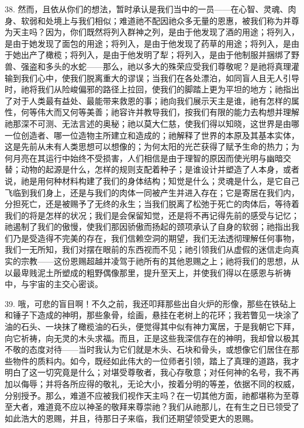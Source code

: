 38. 然而，且依从你们的想法，暂时承认是我们当中的一员——在心智、灵魂、肉身、软弱和处境上与我们相似；难道祂不配因祂众多无量的恩惠，被我们称为并尊为天主吗？因为，你们既然将列入群神之列，是由于他发现了酒的用途；将列入，是由于她发现了面包的用途；将列入，是由于他发现了药草的用途；将列入，是由于她出产了橄榄；将列入，是由于他发明了犁；将列入，是由于他制服并捆绑了野兽、强盗和多头的水蛇——那么，祂以多大的殊荣应受我们尊敬呢？是祂将真理灌输到我们心中，使我们脱离重大的谬误；当我们在各处漂泊，如同盲人且无人引导时，祂将我们从险峻偏邪的路径上拉回，使我们的脚踏上更为平坦的地方；祂指出了对于人类最有益处、最能带来救恩的事；祂向我们展示天主是谁，祂有怎样的属性，何等伟大而又何等美善；祂容许并教导我们，按我们有限的能力去构想并理解祂那深不可测、无法言述的奥秘；祂以莫大仁慈，使我们得以知晓，这世界是由哪一位创造者、哪一位造物主所建立和造成的；祂解释了世界的本原及其基本实体，这是先前从未有人类思想可以想像的；为何太阳的光芒获得了赋予生命的热力；为何月亮在其运行中始终不受损害，人们相信是由于理智的原因而使光明与幽暗交替；动物的起源是什么，怎样的规则支配着种子；是谁设计并塑造了人本身，或者说，祂是用何种材料构建了我们的身体结构；知觉是什么；灵魂是什么，是它自己飞临到我们身上，还是与我们的肉体一同被产生并进入存在；它是寄居在我们内，分担死亡，还是被赐予了无终的永生；当我们脱离了松弛于死亡的肉体后，等待着我们的将是怎样的状况；我们是会保留知觉，还是将不再记得先前的感受与记忆；祂遏制了我们的傲慢，使我们那因骄傲而扬起的颈项承认了自身的软弱；祂指出我们乃是受造得不完美的存在，我们信赖空洞的期望，我们无法透彻理解任何事物，我们一无所知，我们对摆在眼前的东西视而不见；祂引领我们从虚假的迷信走向真实的宗教——这份恩赐超越并凌驾于祂所有的其他恩赐之上；祂将我们的思想，从以最卑贱泥土所塑成的粗野偶像那里，提升至天上，并使我们得以在感恩与祈祷中，与宇宙的主交心密谈。\par

39. 哦，可悲的盲目啊！不久之前，我还叩拜那些出自火炉的形像，那些在铁砧上和锤子下造成的神明，那些象骨，绘画，悬挂在老树上的花环；我若瞥见一块涂了油的石头、一块抹了橄榄油的石头，便觉得其中似有神力寓居，于是我朝它下拜，向它祈祷，向无灵的木头求福。而且，正是这些我深信存在的神明，我却曾以极其不敬的态度对待——当时我认为它们就是木头、石块和骨头，或想像它们居住在那些物件的质料内。如今，既经如此伟大的一位师者引领，踏上了真理的道路，我才明白了这一切究竟是什么；对堪受尊敬者，我心存敬意；对任何神的名号，我不再加以侮辱；并将各所应得的敬礼，无论大小，按着分明的等差，依据不同的权威，分别授予。那么，难道不应被我们视作天主吗？在一切其他方面，祂都堪称为至尊至大者，难道竟不应以神圣的敬拜来尊崇祂？我们从祂那儿，在有生之日已领受了如此浩大的恩赐，并且，待那日子来临，我们还期望领受更大的恩赐。\par

